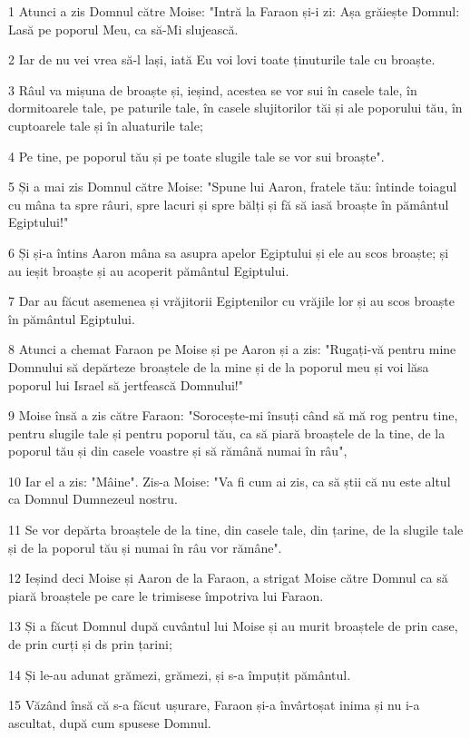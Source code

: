 \par 1 Atunci a zis Domnul către Moise: "Intră la Faraon și-i zi: Așa grăiește Domnul: Lasă pe poporul Meu, ca să-Mi slujească.
\par 2 Iar de nu vei vrea să-l lași, iată Eu voi lovi toate ținuturile tale cu broaște.
\par 3 Râul va mișuna de broaște și, ieșind, acestea se vor sui în casele tale, în dormitoarele tale, pe paturile tale, în casele slujitorilor tăi și ale poporului tău, în cuptoarele tale și în aluaturile tale;
\par 4 Pe tine, pe poporul tău și pe toate slugile tale se vor sui broaște".
\par 5 Și a mai zis Domnul către Moise: "Spune lui Aaron, fratele tău: întinde toiagul cu mâna ta spre râuri, spre lacuri și spre bălți și fă să iasă broaște în pământul Egiptului!"
\par 6 Și și-a întins Aaron mâna sa asupra apelor Egiptului și ele au scos broaște; și au ieșit broaște și au acoperit pământul Egiptului.
\par 7 Dar au făcut asemenea și vrăjitorii Egiptenilor cu vrăjile lor și au scos broaște în pământul Egiptului.
\par 8 Atunci a chemat Faraon pe Moise și pe Aaron și a zis: "Rugați-vă pentru mine Domnului să depărteze broaștele de la mine și de la poporul meu și voi lăsa poporul lui Israel să jertfească Domnului!"
\par 9 Moise însă a zis către Faraon: "Sorocește-mi însuți când să mă rog pentru tine, pentru slugile tale și pentru poporul tău, ca să piară broaștele de la tine, de la poporul tău și din casele voastre și să rămână numai în râu",
\par 10 Iar el a zis: "Mâine". Zis-a Moise: "Va fi cum ai zis, ca să știi că nu este altul ca Domnul Dumnezeul nostru.
\par 11 Se vor depărta broaștele de la tine, din casele tale, din țarine, de la slugile tale și de la poporul tău și numai în râu vor rămâne".
\par 12 Ieșind deci Moise și Aaron de la Faraon, a strigat Moise către Domnul ca să piară broaștele pe care le trimisese împotriva lui Faraon.
\par 13 Și a făcut Domnul după cuvântul lui Moise și au murit broaștele de prin case, de prin curți și ds prin țarini;
\par 14 Și le-au adunat grămezi, grămezi, și s-a împuțit pământul.
\par 15 Văzând însă că s-a făcut ușurare, Faraon și-a învârtoșat inima și nu i-a ascultat, după cum spusese Domnul.
